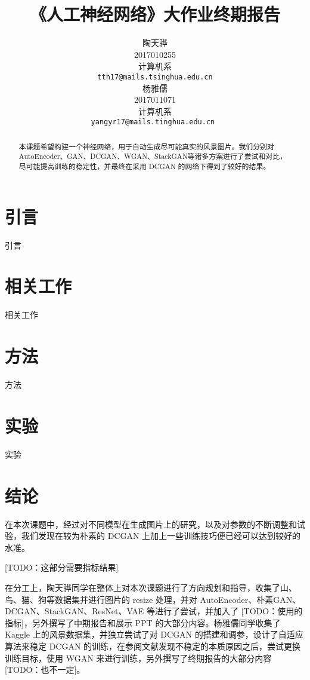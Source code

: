 \documentclass{article}
\title{《人工神经网络》大作业终期报告}
\author{%
  陶天骅 \\
  2017010255 \\
  计算机系 \\
  \texttt{tth17@mails.tsinghua.edu.cn} \\
  \And
  杨雅儒\\
  2017011071 \\
  计算机系 \\
  \texttt{yangyr17@mails.tinghua.edu.cn
  } \\
}
\begin{document}
\begin{CJK*}{UTF8}{gbsn}
\maketitle


\begin{abstract}

本课题希望构建一个神经网络，用于自动生成尽可能真实的风景图片。我们分别对AutoEncoder、GAN、DCGAN、WGAN、StackGAN等诸多方案进行了尝试和对比，尽可能提高训练的稳定性，并最终在采用 DCGAN 的网络下得到了较好的结果。

\end{abstract}

\section{引言}

引言

\section{相关工作}

相关工作

\section{方法}

方法

\section{实验}

实验

\section{结论}

在本次课题中，经过对不同模型在生成图片上的研究，以及对参数的不断调整和试验，我们发现在较为朴素的 DCGAN 上加上一些训练技巧便已经可以达到较好的水准。

[TODO：这部分需要指标结果]

在分工上，陶天骅同学在整体上对本次课题进行了方向规划和指导，收集了山、鸟、猫、狗等数据集并进行图片的 resize 处理，并对 AutoEncoder、朴素GAN、DCGAN、StackGAN、ResNet、VAE 等进行了尝试，并加入了 [TODO：使用的指标]，另外撰写了中期报告和展示 PPT 的大部分内容。杨雅儒同学收集了 Kaggle 上的风景数据集，并独立尝试了对 DCGAN 的搭建和调参，设计了自适应算法来稳定 DCGAN 的训练，在参阅文献发现不稳定的本质原因之后，尝试更换训练目标，使用 WGAN 来进行训练，另外撰写了终期报告的大部分内容 [TODO：也不一定]。


\end{CJK*}
\end{document}
